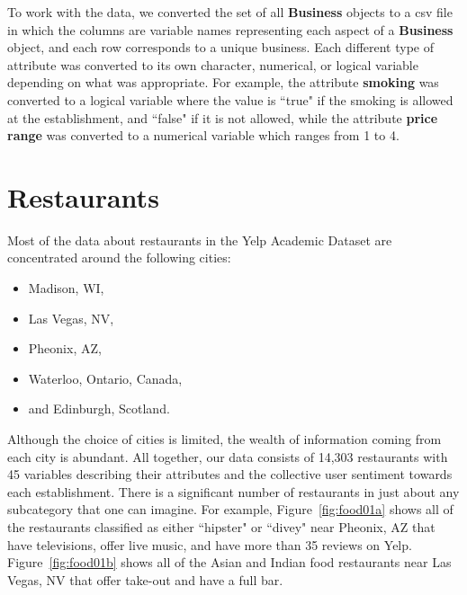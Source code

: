 \documentclass[11pt]{article}
\begin{document}
To work with the data, we converted the set of all \textbf{Business} objects to a csv file in which the columns are variable names representing each aspect of a \textbf{Business} object, and each row corresponds to a unique business. Each different type of attribute was converted to its own character, numerical, or logical variable depending on what was appropriate. For example, the attribute \textbf{smoking} was converted to a logical variable where the value is ``true" if the smoking is allowed at the establishment, and ``false" if it is not allowed, while the attribute \textbf{price range} was converted to a numerical variable which ranges from 1 to 4.


\section{Restaurants}

Most of the data about restaurants in the Yelp Academic Dataset are concentrated around the following cities:
\begin{itemize}
	\item Madison, WI, 
	\item Las Vegas, NV,
	\item Pheonix, AZ,
	\item Waterloo, Ontario, Canada,
	\item and Edinburgh, Scotland.
\end{itemize}
Although the choice of cities is limited, the wealth of information coming from each city is abundant. All together, our data consists of 14,303 restaurants with 45 variables describing their attributes and the collective user sentiment towards each establishment. There is a significant number of restaurants in just about any subcategory that one can imagine. For example, Figure~\ref{fig:food01a} shows all of the restaurants classified as either ``hipster" or ``divey" near Pheonix, AZ that have televisions, offer live music, and have more than 35 reviews on Yelp. Figure~\ref{fig:food01b} shows all of the Asian and Indian food restaurants near Las Vegas, NV that offer take-out and have a full bar.
\end{document}
